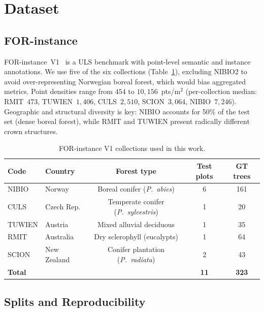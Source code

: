 \documentclass[runningheads]{llncs}
\begin{document}
\section{Dataset}\label{sec:dataset}

\subsection{FOR-instance}

FOR-instance~V1~\cite{puliti2023} is a ULS benchmark with point-level semantic and instance annotations. We use five of the six collections (Table~\ref{tab:collections}), excluding NIBIO2 to avoid over-representing Norwegian boreal forest, which would bias aggregated metrics. Point densities range from $454$ to $10{,}156$~pts/m$^2$ (per-collection median: RMIT~$473$, TUWIEN~$1{,}406$, CULS~$2{,}510$, SCION~$3{,}064$, NIBIO~$7{,}246$). Geographic and structural diversity is key: NIBIO accounts for 50\% of the test set (dense boreal forest), while RMIT and TUWIEN present radically different crown structures.

\begin{table}[H]
\centering
\caption{FOR-instance V1 collections used in this work.}\label{tab:collections}
\begin{tabular}{llccc}
\toprule
Code & Country & Forest type & Test plots & GT trees \\
\midrule
NIBIO  & Norway        & Boreal conifer (\emph{P.~abies})          & 6 & 161 \\
CULS   & Czech Rep.    & Temperate conifer (\emph{P.~sylvestris})  & 1 &  20 \\
TUWIEN & Austria       & Mixed alluvial deciduous                  & 1 &  35 \\
RMIT   & Australia     & Dry sclerophyll (eucalypts)               & 1 &  64 \\
SCION  & New Zealand   & Conifer plantation (\emph{P.~radiata})    & 2 &  43 \\
\midrule
\textbf{Total} & & & \textbf{11} & \textbf{323} \\
\bottomrule
\end{tabular}
\end{table}

\subsection{Splits and Reproducibility}\label{sec:splits}
\end{document}
